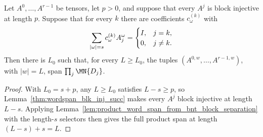 \begin{lemma}
    \label{thm:ph_eventual_word_span_from_selectors}
    \leanok
    Let $A^0,\ldots,A^{r-1}$ be tensors, let $p>0$, and suppose that every
    $A^j$ is block injective at length $p$. Suppose that for every $k$ there
    are coefficients $c_\omega^{(k)}$ with
    \begin{align}
        \sum_{|\omega|=s}c_\omega^{(k)}A_j^\omega=
        \begin{cases}
            I, & j=k,    \\
            0, & j\ne k.
        \end{cases}
        \notag
    \end{align}
    Then there is $L_0$ such that, for every $L\ge L_0$, the tuples
    $(A^{0,w},\ldots,A^{r-1,w})$, with $|w|=L$, span $\prod_j\MN{D_j}$.
\end{lemma}
\begin{proof}
    \leanok
    With $L_0=s+p$, any $L\ge L_0$ satisfies $L-s\ge p$, so
    Lemma~\ref{thm:wordspan_blk_inj_succ} makes every $A^j$ block injective
    at length $L-s$. Applying
    Lemma~\ref{lem:product_word_span_from_bnt_block_separation} with the
    length-$s$ selectors then gives the full product span at length
    $(L-s)+s=L$.
\end{proof}

